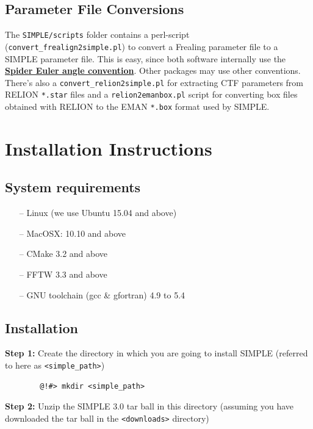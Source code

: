 \documentclass[a4paper,11pt]{article}
\begin{document}
\subsection{Parameter File Conversions}
The \texttt{SIMPLE/scripts} folder contains a perl-script (\texttt{convert\_frealign2simple.pl}) to convert a Frealing parameter file to a SIMPLE parameter file. This is easy, since both software internally use the \href{http://spider.wadsworth.org/spider_doc/spider/docs/euler.html}{\textbf{\textcolor{BurntOrange}{Spider Euler angle convention}}}. Other packages may use other conventions. There's also a \texttt{convert\_relion2simple.pl} for extracting CTF parameters from RELION \texttt{*.star} files and a \texttt{relion2emanbox.pl} script for converting box files obtained with RELION to the EMAN \texttt{*.box} format used by SIMPLE.

\section{Installation Instructions}

\subsection{System requirements}
\begin{itemize}
	\item[--] Linux (we use Ubuntu 15.04 and above)
	\item[--] MacOSX: 10.10 and above
	\item[--] CMake 3.2 and above
	\item[--] FFTW 3.3 and above
	\item[--] GNU toolchain (gcc \& gfortran) 4.9 to 5.4
\end{itemize}

\subsection{Installation}
\noindent{}\textbf{Step 1:} Create the directory in which you are going to install SIMPLE (referred to here as \texttt{<simple\_path>})

\begin{verbatim}
        @!#> mkdir <simple_path>
\end{verbatim}

\noindent{}\textbf{Step 2:} Unzip the SIMPLE 3.0 tar ball in this directory (assuming you have downloaded the tar ball in the \texttt{<downloads>} directory)
\end{document}
